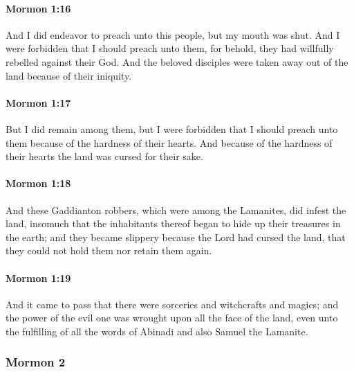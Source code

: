 		\paragraph{Mormon 1:16} %
			\label{MORMON-1-16}

			And I did endeavor to preach unto this people,
			but my mouth was shut.
			And I were forbidden that I should preach unto them,
			for behold, they had willfully rebelled against their God.
			And the beloved disciples were taken away out of the land
			because of their iniquity.

		\paragraph{Mormon 1:17} %
			\label{MORMON-1-17}

			But I did remain among them,
			but I were forbidden that I should preach unto them
			because of the hardness of their hearts.
			And because of the hardness of their hearts
			the land was cursed for their sake.

		\paragraph{Mormon 1:18} %
			\label{MORMON-1-18}

			And these Gaddianton robbers,
			which were among the Lamanites,
			did infest the land,
			insomuch that the inhabitants thereof began
			to hide up their treasures in the earth;
			and they became slippery
			because the Lord had cursed the land,
			that they could not hold them nor retain them again.

		\paragraph{Mormon 1:19} %
			\label{MORMON-1-19}

			And it came to pass that there were sorceries and witchcrafts and magics;
			and the power of the evil one was wrought upon all the face of the land,
			even unto the fulfilling of all the words of Abinadi
			and also Samuel the Lamanite.

	\subsubsection{Mormon 2} %
		\label{MORMON-2}
		
